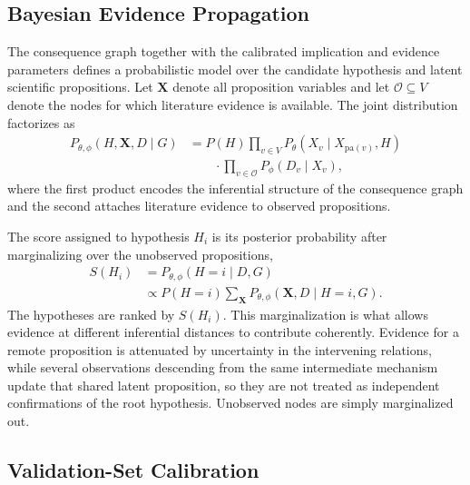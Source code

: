 \documentclass[twoside]{article}
\begin{document}
\subsection{Bayesian Evidence Propagation}
\label{sec:bayesian-propagation}

The consequence graph together with the calibrated implication and evidence
parameters defines a probabilistic model over the candidate hypothesis and
latent scientific propositions. Let $\mathbf{X}$ denote all proposition
variables and let $\mathcal{O}\subseteq V$ denote the nodes for which literature
evidence is available. The joint distribution factorizes as
\begin{equation}
\begin{split}
    P_{\theta,\phi}(H,\mathbf{X},D\mid G)
    &=
    P(H)
    \prod_{v\in V}
    P_{\theta}(X_v\mid X_{\mathrm{pa}(v)},H) \\
    &\qquad\cdot
    \prod_{v\in\mathcal{O}}
    P_{\phi}(D_v\mid X_v),
\end{split}
\label{eq:joint-model}
\end{equation}
where the first product encodes the inferential structure of the consequence
graph and the second attaches literature evidence to observed propositions.

The score assigned to hypothesis $H_i$ is its posterior probability after
marginalizing over the unobserved propositions,
\begin{equation}
\begin{split}
    S(H_i)
    &=
    P_{\theta,\phi}(H=i\mid D,G)  \\
    &\propto
    P(H=i)
    \sum_{\mathbf{X}}
    P_{\theta,\phi}(\mathbf{X},D\mid H=i,G).
\end{split}
    \label{eq:hypothesis-posterior}
\end{equation}
The hypotheses are ranked by $S(H_i)$. This marginalization is what allows
evidence at different inferential distances to contribute coherently. Evidence
for a remote proposition is attenuated by uncertainty in the intervening
relations, while several observations descending from the same intermediate
mechanism update that shared latent proposition, so they are not treated as
independent confirmations of the root hypothesis. Unobserved nodes are simply
marginalized out.

\subsection{Validation-Set Calibration}
\label{sec:calibration}
\end{document}
